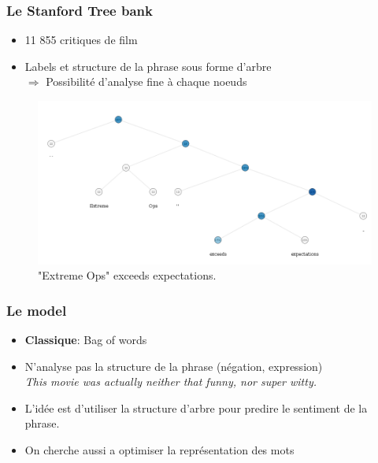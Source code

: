 \documentclass{beamer}
\begin{document}

\begin{frame}
\frametitle{Le Stanford Tree bank}
\begin{itemize}\setlength{\itemsep}{5mm}
\item 11 855 critiques de film
\item Labels et structure de la phrase sous forme d'arbre\\
$\Rightarrow$ Possibilité d'analyse fine à chaque noeuds
\end{itemize}

\begin{figure}[htp]
\centering
\includegraphics[scale=0.2]{fig/Tree10.png}
\caption{"Extreme Ops" exceeds expectations.}
\end{figure}

\end{frame}


\begin{frame}
\frametitle{Le model}
\begin{itemize}\setlength{\itemsep}{7mm}
\item \textbf{Classique}: Bag of words 
\item N'analyse pas la structure de la phrase (négation, expression)\\
\emph{This movie was actually neither that funny, nor super witty.}
\item L'idée est d'utiliser la structure d'arbre pour predire le sentiment de la phrase.
\item On cherche aussi a optimiser la représentation des mots
\end{itemize}

\end{frame}

\end{document}
